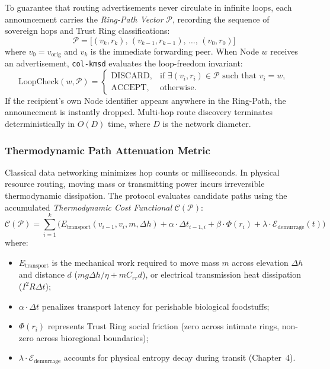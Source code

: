To guarantee that routing advertisements never circulate in infinite loops, each announcement carries the \textit{Ring-Path Vector} $\mathcal{P}$, recording the sequence of sovereign hops and Trust Ring classifications:
\begin{equation}
\mathcal{P} = \big[ (v_k, r_k), \, (v_{k-1}, r_{k-1}), \, \dots, \, (v_0, r_0) \big]
\label{eq:ring_path_vector}
\end{equation}
where $v_0 = v_{\mathrm{orig}}$ and $v_k$ is the immediate forwarding peer. When Node $w$ receives an advertisement, \texttt{col-kmsd} evaluates the loop-freedom invariant:
\begin{equation}
\mathrm{LoopCheck}(w, \mathcal{P}) = 
\left\{ \begin{array}{ll}
\mathrm{DISCARD}, & \mbox{if } \exists (v_i, r_i) \in \mathcal{P} \mbox{ such that } v_i = w, \\
\mathrm{ACCEPT}, & \mbox{otherwise}.
\end{array} \right.
\label{eq:loop_check}
\end{equation}
If the recipient's own Node identifier appears anywhere in the Ring-Path, the announcement is instantly dropped. Multi-hop route discovery terminates deterministically in $O(D)$ time, where $D$ is the network diameter.

\subsubsection{Thermodynamic Path Attenuation Metric}

Classical data networking minimizes hop counts or milliseconds. In physical resource routing, moving mass or transmitting power incurs irreversible thermodynamic dissipation. The protocol evaluates candidate paths using the accumulated \textit{Thermodynamic Cost Functional} $\mathcal{C}(\mathcal{P})$:
\begin{equation}
\mathcal{C}(\mathcal{P}) = \sum_{i=1}^{k} \Big( E_{\mathrm{transport}}(v_{i-1}, v_i, m, \Delta h) + \alpha \cdot \Delta t_{i-1, i} + \beta \cdot \Phi(r_i) + \lambda \cdot \mathcal{E}_{\mathrm{demurrage}}(t) \Big)
\label{eq:thermo_cost}
\end{equation}
where:
\begin{itemize}
  \item $E_{\mathrm{transport}}$ is the mechanical work required to move mass $m$ across elevation $\Delta h$ and distance $d$ ($m g \Delta h / \eta + m C_{rr} d$), or electrical transmission heat dissipation ($I^2 R \Delta t$);
  \item $\alpha \cdot \Delta t$ penalizes transport latency for perishable biological foodstuffs;
  \item $\Phi(r_i)$ represents Trust Ring social friction (zero across intimate rings, non-zero across bioregional boundaries);
  \item $\lambda \cdot \mathcal{E}_{\mathrm{demurrage}}$ accounts for physical entropy decay during transit (Chapter~4).
\end{itemize}

